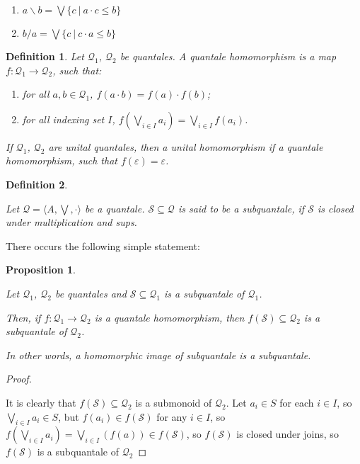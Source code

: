 \documentclass[a4paper]{article}
\theoremstyle{defin}
\newtheorem{defin}{Definition}
\theoremstyle{theorem}
\theoremstyle{prop}
\newtheorem{prop}{Proposition}
\theoremstyle{lemma}
\theoremstyle{ex}
\theoremstyle{col}
\begin{document}
\begin{enumerate}
\item $a \backslash b = \bigvee \{ c \: | \: a \cdot c \leq b \}$
\item $b / a = \bigvee \{ c \: | \: c \cdot a \leq b \}$
\end{enumerate}

\begin{defin}

  Let $\mathcal{Q}_1$, $\mathcal{Q}_2$ be quantales. A quantale homomorphism is a map $f : \mathcal{Q}_1 \to \mathcal{Q}_2$, such that:

  \begin{enumerate}
    \item for all $a,b \in \mathcal{Q}_1$, $f(a \cdot b) = f(a) \cdot f(b)$;
    \item for all indexing set $I$, $f(\bigvee \limits_{i \in I} a_i) = \bigvee \limits_{i \in I} f(a_i)$.
  \end{enumerate}

  If $\mathcal{Q}_1$, $\mathcal{Q}_2$ are unital quantales, then a unital homomorphism if a quantale homomorphism, such that $f(\varepsilon) = \varepsilon$.
\end{defin}

\begin{defin}
$ $

  Let $\mathcal{Q} = \langle A, \bigvee, \cdot \rangle$ be a quantale. $\mathcal{S} \subseteq \mathcal{Q}$ is said to be a subquantale, if
  $\mathcal{S}$ is closed under multiplication and sups.
\end{defin}

There occurs the following simple statement:

\begin{prop}
  $ $

Let $\mathcal{Q}_1$, $\mathcal{Q}_2$ be quantales and $\mathcal{S} \subseteq \mathcal{Q}_1$ is a subquantale of
$\mathcal{Q}_1$.

Then, if $f : \mathcal{Q}_1 \to \mathcal{Q}_2$ is a quantale homomorphism, then $f(\mathcal{S}) \subseteq \mathcal{Q}_2$ is a subquantale of $\mathcal{Q}_2$.

In other words, a homomorphic image of subquantale is a subquantale.
\end{prop}

\begin{proof}
$ $

  It is clearly that $f(\mathcal{S}) \subseteq \mathcal{Q}_2$ is a submonoid of $\mathcal{Q}_2$. Let $a_i \in S$ for each $i
  \in I$, so $\bigvee \limits_{i \in I} a_i \in S$, but $f(a_i) \in f(\mathcal{S})$ for any $i \in I$, so $f(\bigvee
  \limits_{i \in I} a_i) = \bigvee \limits_{i \in I} (f (a)) \in f(\mathcal{S})$, so $f(\mathcal{S})$ is closed
  under joins, so $f(\mathcal{S})$ is a subquantale of $\mathcal{Q}_2$
\end{proof}
\end{document}
